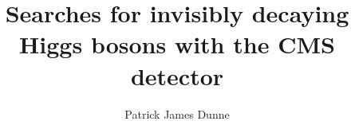 \documentclass{thesis}
\title{Searches for invisibly decaying Higgs bosons with the CMS detector}
\author{Patrick James Dunne}
\begin{document}
\begin{frontmatter}
  
\end{frontmatter}

\begin{mainmatter}
  
  
  
  
  
  
  
  

\end{mainmatter}

%  

\begin{backmatter}
  
\end{backmatter}

\end{document}
